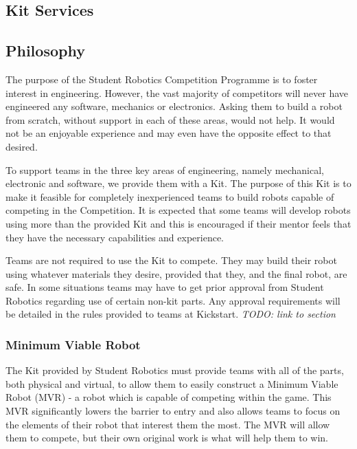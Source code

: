 \begin{draft}
\section{Kit Services}

\subsection{Philosophy}

The purpose of the Student Robotics Competition Programme is to foster interest in engineering. However, the vast majority of competitors will never have engineered any software, mechanics or electronics. Asking them to build a robot from scratch, without support in each of these areas, would not help. It would not be an enjoyable experience and may even have the opposite effect to that desired.

To support teams in the three key areas of engineering, namely mechanical, electronic and software, we provide them with a Kit. The purpose of this Kit is to make it feasible for completely inexperienced teams to build robots capable of competing in the Competition. It is expected that some teams will develop robots using more than the provided Kit and this is encouraged if their mentor feels that they have the necessary capabilities and experience.

Teams are not required to use the Kit to compete. They may build their robot using whatever materials they desire, provided that they, and the final robot, are safe. In some situations teams may have to get prior approval from Student Robotics regarding use of certain non-kit parts. Any approval requirements will be detailed in the rules provided to teams at Kickstart. \emph{TODO: link to section}

\subsubsection{Minimum Viable Robot}

The Kit provided by Student Robotics must provide teams with all of the parts, both physical and virtual, to allow them to easily construct a Minimum Viable Robot (MVR) - a robot which is capable of competing within the game. This MVR significantly lowers the barrier to entry and also allows teams to focus on the elements of their robot that interest them the most. The MVR will allow them to compete, but their own original work is what will help them to win.


\end{draft}
